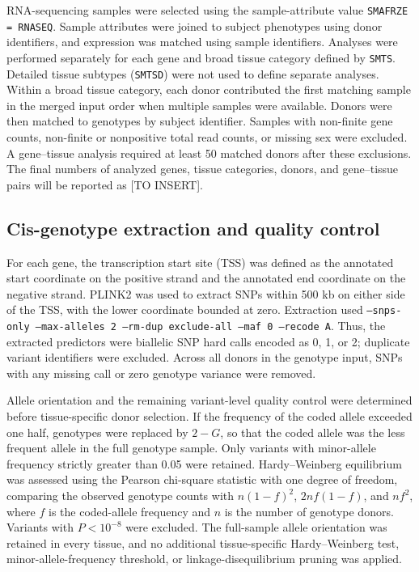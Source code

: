 \documentclass[12pt]{article}
\begin{document}
RNA-sequencing samples were selected using the sample-attribute value
\texttt{SMAFRZE = RNASEQ}. Sample attributes were joined to subject phenotypes
using donor identifiers, and expression was matched using sample identifiers.
Analyses were performed separately for each gene and broad tissue category
defined by \texttt{SMTS}. Detailed tissue subtypes (\texttt{SMTSD}) were not
used to define separate analyses. Within a broad tissue category, each donor
contributed the first matching sample in the merged input order when multiple
samples were available. Donors were then matched to genotypes by subject
identifier. Samples with non-finite gene counts, non-finite or nonpositive
total read counts, or missing sex were excluded. A gene--tissue analysis
required at least 50 matched donors after these exclusions. The final numbers
of analyzed genes, tissue categories, donors, and gene--tissue pairs will be
reported as [TO INSERT].

\subsection{Cis-genotype extraction and quality control}
For each gene, the transcription start site (TSS) was defined as the annotated
start coordinate on the positive strand and the annotated end coordinate on
the negative strand. PLINK2 was used to extract SNPs within 500 kb on either
side of the TSS, with the lower coordinate bounded at zero. Extraction used
\texttt{--snps-only --max-alleles 2 --rm-dup exclude-all --maf 0 --recode A}.
Thus, the extracted predictors were biallelic SNP hard calls encoded as
0, 1, or 2; duplicate variant identifiers were excluded. Across all donors
in the genotype input, SNPs with any missing call or zero genotype variance
were removed.

Allele orientation and the remaining variant-level quality control were
determined before tissue-specific donor selection. If the frequency of the
coded allele exceeded one half, genotypes were replaced by $2-G$, so that
the coded allele was the less frequent allele in the full genotype sample.
Only variants with minor-allele frequency strictly greater than 0.05 were
retained. Hardy--Weinberg equilibrium was assessed using the Pearson
chi-square statistic with one degree of freedom, comparing the observed
genotype counts with $n(1-f)^2$, $2nf(1-f)$, and $nf^2$, where $f$ is the
coded-allele frequency and $n$ is the number of genotype donors. Variants
with $P<10^{-8}$ were excluded. The full-sample allele orientation was
retained in every tissue, and no additional tissue-specific
Hardy--Weinberg test, minor-allele-frequency threshold, or
linkage-disequilibrium pruning was applied.
\end{document}
